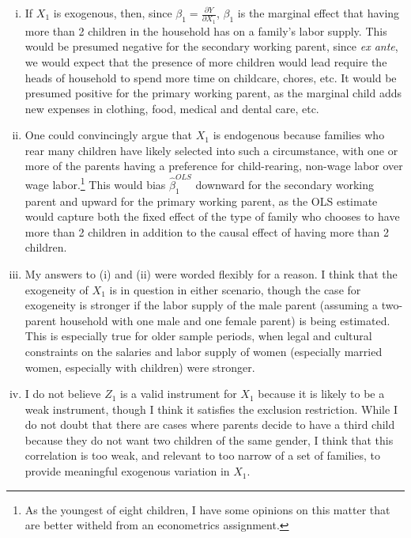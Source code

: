 \documentclass{article}
\newcommand{\bols}{\hat{\beta}^{OLS}}
\begin{document}
\begin{enumerate}[(i)]
	\item If $X_1$ is exogenous, then, since ${\beta_1 = \frac{\partial Y}{\partial X_1}}$, $\beta_1$ is the marginal effect that having more than 2 children in the household has on a family's labor supply. This would be presumed negative for the secondary working parent, since \textit{ex ante}, we would expect that the presence of more children would lead require the heads of household to spend more time on childcare, chores, etc. It would be presumed positive for the primary working parent, as the marginal child adds new expenses in clothing, food, medical and dental care, etc.
	
	\item One could convincingly argue that $X_1$ is endogenous because families who rear many children have likely selected into such a circumstance, with one or more of the parents having a preference for child-rearing, non-wage labor over wage labor.\footnote{As the youngest of eight children, I have some opinions on this matter that are better witheld from an econometrics assignment.} This would bias $\bols_1$ downward for the secondary working parent and upward for the primary working parent, as the OLS estimate would capture both the fixed effect of the type of family who chooses to have more than 2 children in addition to the causal effect of having more than 2 children.
	
	\item My answers to (i) and (ii) were worded flexibly for a reason. I think that the exogeneity of $X_1$ is in question in either scenario, though the case for exogeneity is stronger if the labor supply of the male parent (assuming a two-parent household with one male and one female parent) is being estimated. This is especially true for older sample periods, when legal and cultural constraints on the salaries and labor supply of women (especially married women, especially with children) were stronger.
	
	\item I do not believe $Z_1$ is a valid instrument for $X_1$ because it is likely to be a weak instrument, though I think it satisfies the exclusion restriction. While I do not doubt that there are cases where parents decide to have a third child because they do not want two children of the same gender, I think that this correlation is too weak, and relevant to too narrow of a set of families, to provide meaningful exogenous variation in $X_1$.
	

\end{enumerate}
\end{document}
